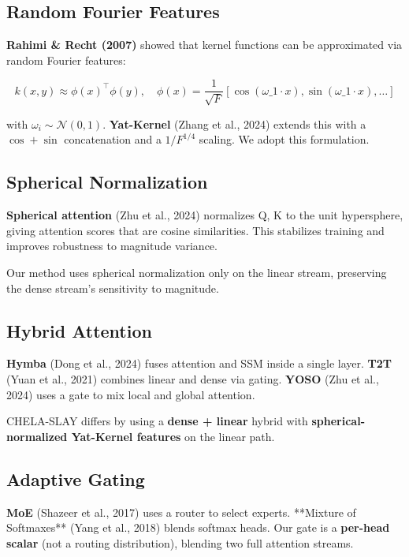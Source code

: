 \subsection{Random Fourier Features}

\textbf{Rahimi \& Recht (2007)} showed that kernel functions can be approximated 
via random Fourier features:

\[
k(x, y) \approx \phi(x)^\top \phi(y), \quad
\phi(x) = \frac{1}{\sqrt{F}} \left[ \cos(\omega\_1 \cdot x), \sin(\omega\_1 \cdot x), \dots \right]
\]

with $\omega_i \sim \mathcal{N}(0, 1)$. \textbf{Yat-Kernel} (Zhang et al., 2024) 
extends this with a $\cos + \sin$ concatenation and a $1/F^{1/4}$ scaling. 
We adopt this formulation.

\subsection{Spherical Normalization}

\textbf{Spherical attention} (Zhu et al., 2024) normalizes Q, K to the unit 
hypersphere, giving attention scores that are cosine similarities. This 
stabilizes training and improves robustness to magnitude variance.

Our method uses spherical normalization only on the linear stream, 
preserving the dense stream's sensitivity to magnitude.

\subsection{Hybrid Attention}

\textbf{Hymba} (Dong et al., 2024) fuses attention and SSM inside a single 
layer. \textbf{T2T} (Yuan et al., 2021) combines linear and dense via gating. 
\textbf{YOSO} (Zhu et al., 2024) uses a gate to mix local and global attention.

CHELA-SLAY differs by using a \textbf{dense + linear} hybrid with 
\textbf{spherical-normalized Yat-Kernel features} on the linear path.

\subsection{Adaptive Gating}

\textbf{MoE} (Shazeer et al., 2017) uses a router to select experts. **Mixture 
of Softmaxes** (Yang et al., 2018) blends softmax heads. Our gate is a 
\textbf{per-head scalar} (not a routing distribution), blending two full 
attention streams.

